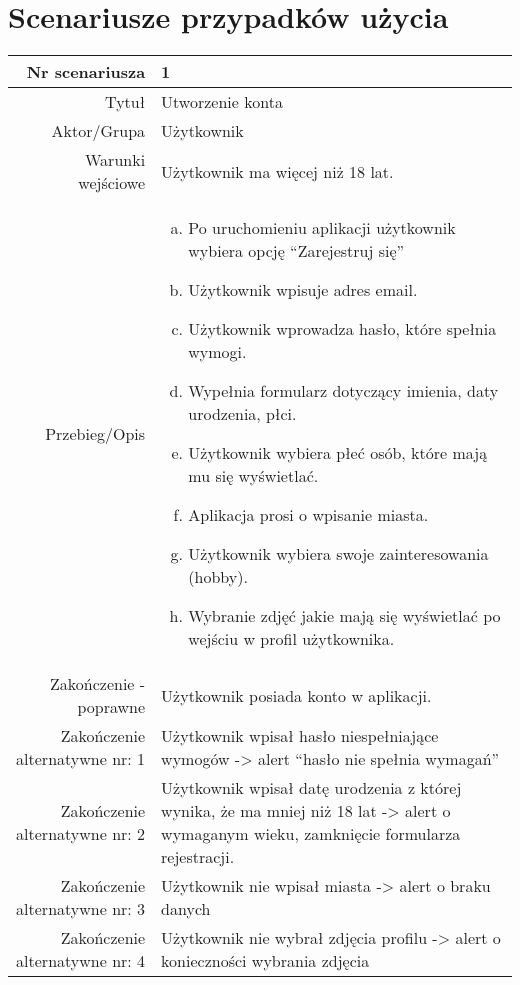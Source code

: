\documentclass[12pt,a4paper]{article}
\begin{document}
\section{Scenariusze przypadków użycia}

\begin{tabular}{|r|l|} \hline
Nr scenariusza & 1 \\
\hline
Tytuł & Utworzenie konta\\
\hline
Aktor/Grupa & Użytkownik \\
\hline
Warunki wejściowe & Użytkownik ma więcej niż 18 lat. \\
\hline
Przebieg/Opis & 
\begin{enumerate}[a)]
\item Po uruchomieniu aplikacji użytkownik wybiera opcję “Zarejestruj się”
\item Użytkownik wpisuje adres email.
\item Użytkownik wprowadza hasło, które spełnia wymogi.
\item Wypełnia formularz dotyczący imienia, daty urodzenia, płci.
\item Użytkownik wybiera płeć osób, które mają mu się wyświetlać.
\item Aplikacja prosi o wpisanie miasta.
\item Użytkownik wybiera swoje zainteresowania (hobby).
\item  Wybranie zdjęć jakie mają się wyświetlać po wejściu w profil użytkownika.


\end{enumerate}
\\
\hline
Zakończenie - poprawne & Użytkownik posiada konto w aplikacji.
\\ 
\hline
Zakończenie alternatywne nr: 1 & Użytkownik wpisał hasło niespełniające wymogów -> alert “hasło nie spełnia wymagań”
\\
\hline
Zakończenie alternatywne nr: 2 & Użytkownik wpisał datę urodzenia z której wynika, że ma mniej niż 18 lat -> alert o wymaganym wieku, zamknięcie formularza rejestracji.
\\
\hline
Zakończenie alternatywne nr: 3 & Użytkownik nie wpisał miasta -> alert o braku danych
\\
\hline
Zakończenie alternatywne nr: 4 & Użytkownik nie wybrał zdjęcia profilu -> alert o konieczności wybrania zdjęcia
\\
\hline
\end{tabular}
\end{document}
